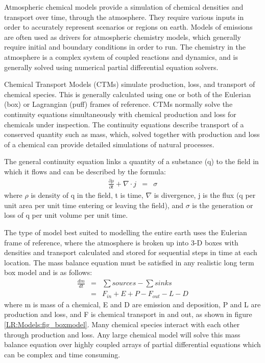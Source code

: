  Atmospheric chemical models provide a simulation of chemical densities and transport over time, through the atmosphere.
  They require various inputs in order to accurately represent scenarios or regions on earth.
  Models of emissions are often used as drivers for atmospheric chemistry models, which generally require initial and boundary conditions in order to run.
  The chemistry in the atmosphere is a complex system of coupled reactions and dynamics, and is generally solved using numerical partial differential equation solvers.
  
  Chemical Transport Models (CTMs) simulate production, loss, and transport of chemical species.
  This is generally calculated using one or both of the Eulerian (box) or Lagrangian (puff) frames of reference.
  CTMs normally solve the continuity equations simultaneously with chemical production and loss for chemicals under inspection. 
  The continuity equations describe transport of a conserved quantity such as mass, which, solved together with production and loss of a chemical can provide detailed simulations of natural processes.
  
  The general continuity equation links a quantity of a substance (q) to the field in which it flows and can be described by the formula:
  \begin{eqnarray*}
    \frac{\partial \rho}{\partial t} + \nabla \cdot j &=& \sigma 
  \end{eqnarray*}
  where $\rho$ is density of q in the field, t is time, $\nabla$ is divergence, j is the flux (q per unit area per unit time entering or leaving the field), and $\sigma$ is the generation or loss of q per unit volume per unit time.
  
  
  The type of model best suited to modelling the entire earth uses the Eulerian frame of reference, where the atmosphere is broken up into 3-D boxes with densities and transport calculated and stored for sequential steps in time at each location.
  The mass balance equation must be satisfied in any realistic long term box model and is as follows: 
  \begin{align*}
    \frac{dm}{dt} &=& \sum{sources}-\sum{sinks} \\
    &=& F_{in} + E + P - F_{out} - L - D 
  \end{align*}
  where m is mass of a chemical, E and D are emission and deposition, P and L are production and loss, and F is chemical transport in and out, as shown in figure \ref{LR:Models:fig_boxmodel}.
  Many chemical species interact with each other through production and loss. 
  Any large chemical model will solve this mass balance equation over highly coupled arrays of partial differential equations which can be complex and time consuming.
  
